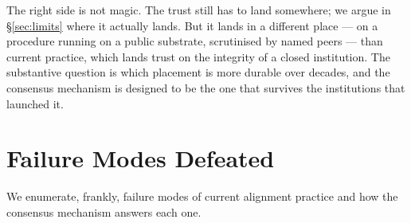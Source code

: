 \documentclass[11pt,a4paper]{article}
\begin{document}
The right side is not magic. The trust still has to land
somewhere; we argue in \S\ref{sec:limits} where it actually
lands. But it lands in a different place --- on a procedure
running on a public substrate, scrutinised by named peers ---
than current practice, which lands trust on the integrity of a
closed institution. The substantive question is which placement
is more durable over decades, and the consensus mechanism is
designed to be the one that survives the institutions that
launched it.

\section{Failure Modes Defeated}

We enumerate, frankly, failure modes of current alignment
practice and how the consensus mechanism answers each one.
\end{document}
